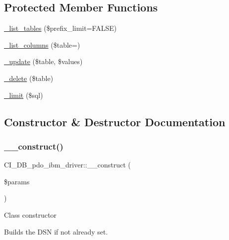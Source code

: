 \subsection*{Protected Member Functions}
\begin{DoxyCompactItemize}
\item 
\mbox{\hyperlink{class_c_i___d_b__pdo__ibm__driver_aeb530698c2aa8b80bd8fa149a8b7ccb4}{\+\_\+list\+\_\+tables}} (\$prefix\+\_\+limit=F\+A\+L\+SE)
\item 
\mbox{\hyperlink{class_c_i___d_b__pdo__ibm__driver_ac31de1f47039ae542258e3378a6469f6}{\+\_\+list\+\_\+columns}} (\$table=\textquotesingle{}\textquotesingle{})
\item 
\mbox{\hyperlink{class_c_i___d_b__pdo__ibm__driver_a28713853b9f37f42e507a6e9dc3d43d4}{\+\_\+update}} (\$table, \$values)
\item 
\mbox{\hyperlink{class_c_i___d_b__pdo__ibm__driver_a80ea4ca1cea0873bbf1ade9b9f9168de}{\+\_\+delete}} (\$table)
\item 
\mbox{\hyperlink{class_c_i___d_b__pdo__ibm__driver_a4601366fb27f00af8b0e2a18501b4f29}{\+\_\+limit}} (\$sql)
\end{DoxyCompactItemize}


\subsection{Constructor \& Destructor Documentation}
\mbox{\label{class_c_i___d_b__pdo__ibm__driver_ac82af58a00cd39a4227d11b6e541f02d}} 
\subsubsection{\texorpdfstring{\+\_\+\+\_\+construct()}{\_\_construct()}}
{\footnotesize\ttfamily C\+I\+\_\+\+D\+B\+\_\+pdo\+\_\+ibm\+\_\+driver\+::\+\_\+\+\_\+construct (\begin{DoxyParamCaption}\item[{}]{\$params }\end{DoxyParamCaption})}

Class constructor

Builds the D\+SN if not already set.


